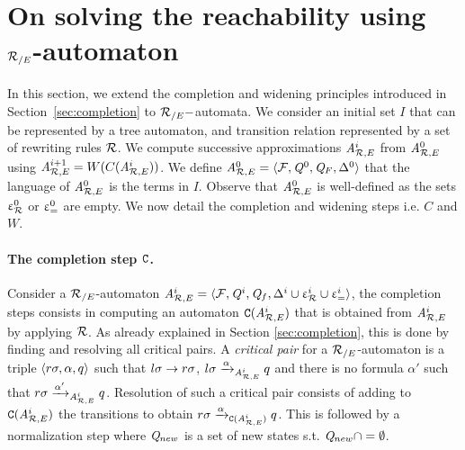 \section{On solving the reachability using ${\mathcal R_{/E}}$-automaton}
\label{sec:recompletion}



In this section, we extend the completion and widening principles
introduced in Section~\ref{sec:completion} to ${\mathcal R_{/E}}-$automata. We
consider an initial set $I$ that can be represented by a tree
automaton, and transition relation represented by a set of rewriting
rules $\mathcal R$. We compute successive approximations ${\it A}_{\mathcal R,E}^i$ from
${\it A}_{\mathcal R,E}^0$ using ${\it A}_{\mathcal R,E}^{i+1}=W(C({\it A}_{\mathcal R,E}^i))$. We define
${\it A}_{\mathcal R,E}^0 = \langle \mathcal{F}, \mathit Q^0, \mathit Q_F, \Delta^0\rangle$ that the language of
${\it A}_{\mathcal R,E}^0$ is the terms in $I$. Observe that ${\it A}_{\mathcal R,E}^0$ is
well-defined as the sets $\upvarepsilon_{\mathcal R}^0$ or $\upvarepsilon_{=}^0$ are empty. We now detail
the completion and widening steps i.e. $C$ and $W$.


\vspace{-.6cm}
\paragraph{The completion step $\mathtt{C}$.}
Consider a ${\mathcal R_{/E}}$-automaton ${\it A}_{\mathcal R,E}^i = \langle \mathcal{F}, \mathit Q^i, \mathit Q_f, \Delta^i \cup \upvarepsilon_{\mathcal R}^i
\cup \upvarepsilon_{=}^i \rangle$, the completion steps consists in computing an automaton
$\mathtt{C}({\it A}_{\mathcal R,E}^i)$ that is obtained from ${\it A}_{\mathcal R,E}^i$ by applying $\mathcal R$. As
already explained in Section \ref{sec:completion}, this is done by finding and
resolving all critical pairs.  A {\em critical pair} for a ${\mathcal R_{/E}}$-automaton is a
triple $\langle r\sigma, \alpha, q\rangle$ such that $l\sigma \rightarrow r\sigma$, $l\sigma
\xrightarrow{\alpha}_{{\it A}_{\mathcal R,E}^i} q$ and there is no formula $\alpha'$ such that $r\sigma
\xrightarrow{\alpha'}_{{\it A}_{\mathcal R,E}^i} q$. Resolution of such a critical pair consists of
adding to $\mathtt{C}({\it A}_{\mathcal R,E}^i)$ the transitions to obtain $r\sigma
\xrightarrow{\alpha}_{\mathtt{C}({\it A}_{\mathcal R,E}^{i})} q$. This is followed by a normalization step
where $\mathit Q_{new}$ is a set of new states s.t. $\mathit Q_{new} \cap =\emptyset$.

